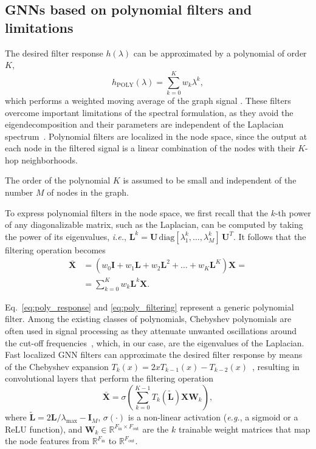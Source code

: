 \documentclass{article}
\def\X{{\mathbf X}}
\def\U{{\mathbf U}}
\def\L{{\mathbf L}}
\def\I{{\mathbf I}}
\def\L{{\mathbf L}}
\begin{document}
\subsection{GNNs based on polynomial filters and limitations}
\label{sec:poly_and_limitations}

The desired filter response $h(\lambda)$ can be approximated by a polynomial of order $K$,
\begin{equation}
    \label{eq:poly_response}
    h_\text{POLY}(\lambda) = \sum_{k=0}^K w_k \lambda^k,
\end{equation}
which performs a weighted moving average of the graph signal \cite{tremblay2018design}.
These filters overcome important limitations of the spectral formulation, as they avoid the eigendecomposition and their parameters are independent of the Laplacian spectrum~\cite{zhang2018end}.
Polynomial filters are localized in the node space, since the output at each node in the filtered signal is a linear combination of the nodes with their $K$-hop neighborhoods.

The order of the polynomial $K$ is assumed to be small and independent of the number $M$ of nodes in the graph.

To express polynomial filters in the node space, we first recall that the $k$-th power of any diagonalizable matrix, such as the Laplacian, can be computed by taking the power of its eigenvalues, \emph{i.e.}, $\L^k = \U \, \text{diag}[\lambda_1^k, \dots, \lambda_M^k] \, \U^T$.
It follows that the filtering operation becomes
\begin{equation}
\label{eq:poly_filtering}
\begin{aligned}
    \bar{\X} &= \left( w_0\I + w_1\L + w_2\L^2 + \dots + w_K \L^K \right) \X = \\
             &= \sum_{k=0}^K w_k \L^k \X.
\end{aligned}
\end{equation}


Eq.~\eqref{eq:poly_response} and \eqref{eq:poly_filtering} represent a generic polynomial filter.
Among the existing classes of polynomials, Chebyshev polynomials are often used in signal processing as they attenuate unwanted oscillations around the cut-off frequencies~\cite{shuman2011chebyshev}, which, in our case, are the eigenvalues of the Laplacian.
Fast localized GNN filters can approximate the desired filter response by means of the Chebyshev expansion $T_k(x) = 2xT_{k-1}(x) - T_{k-2}(x)$~\cite{defferrard2016convolutional}, resulting in convolutional layers that perform the filtering operation
\begin{equation}
    \label{eq:cheb_exp}
    \bar \X = \sigma \left( \sum \limits_{k=0}^{K-1} T_k(\tilde{\L})\X\mathbf{W}_k \right), 
\end{equation}
where $\tilde{\L} = 2\L/\lambda_\text{max} - \I_M$, $\sigma(\cdot)$ is a non-linear activation (\emph{e.g.}, a sigmoid or a ReLU function), and $\mathbf{W}_k \in \mathbb{R}^{F_\text{in} \times F_\text{out}}$ are the $k$ trainable weight matrices that map the node features from $\mathbb{R}^{F_\text{in}}$ to $\mathbb{R}^{F_\text{out}}$.
\end{document}

